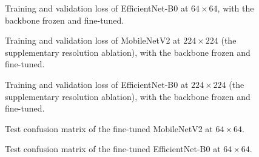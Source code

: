 \begin{figure}[htbp]
  \centering
  \caption{Training and validation loss of EfficientNet-B0 at $64\times64$,
  with the backbone frozen and fine-tuned.}
  \label{fig:efficientnet-loss}
\end{figure}

\begin{figure}[htbp]
  \centering
  \caption{Training and validation loss of MobileNetV2 at $224\times224$ (the
  supplementary resolution ablation), with the backbone frozen and fine-tuned.}
  \label{fig:sota-224-loss}
\end{figure}

\begin{figure}[htbp]
  \centering
  \caption{Training and validation loss of EfficientNet-B0 at $224\times224$
  (the supplementary resolution ablation), with the backbone frozen and
  fine-tuned.}
  \label{fig:efficientnet-224-loss}
\end{figure}

\begin{figure}[htbp]
  \centering
  \caption{Test confusion matrix of the fine-tuned MobileNetV2 at $64\times64$.}
  \label{fig:mobilenetv2-confusion}
\end{figure}

\begin{figure}[htbp]
  \centering
  \caption{Test confusion matrix of the fine-tuned EfficientNet-B0 at
  $64\times64$.}
  \label{fig:efficientnet-confusion}
\end{figure}
